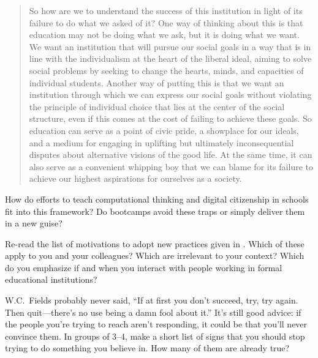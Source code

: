 \begin{quote}

  So how are we to understand the success of this institution
  in light of its failure to do what we asked of it?
  One way of thinking about this is that
  education may not be doing what we ask,
  but it is doing what we want.
  We want an institution that will pursue our social goals
  in a way that is in line with the individualism at the heart of the liberal ideal,
  aiming to solve social problems
  by seeking to change the hearts, minds, and capacities of individual students.
  Another way of putting this is that
  we want an institution through which we can express our social goals
  without violating the principle of individual choice
  that lies at the center of the social structure,
  even if this comes at the cost of failing to achieve these goals.
  So education can serve as a point of civic pride,
  a showplace for our ideals,
  and a medium for engaging in uplifting but ultimately inconsequential disputes
  about alternative visions of the good life.
  At the same time,
  it can also serve as a convenient whipping boy
  that we can blame for its failure to achieve our highest aspirations for ourselves as a society.

\end{quote}

How do efforts to teach computational thinking and digital citizenship in schools
fit into this framework?
Do bootcamps avoid these traps or simply deliver them in a new guise?


Re-read the list of motivations to adopt new practices
given in .
Which of these apply to you and your colleagues?
Which are irrelevant to your context?
Which do you emphasize
if and when you interact with people working in formal educational institutions?


W.C.~Fields probably never said,
``If at first you don’t succeed, try, try again.
Then quit---there's no use being a damn fool about it.''
It's still good advice:
if the people you're trying to reach aren't responding,
it could be that you'll never convince them.
In groups of 3--4,
make a short list of signs that you should stop trying to do something you believe in.
How many of them are already true?


